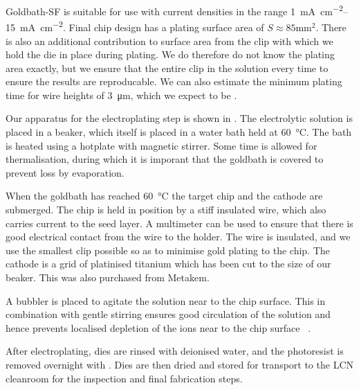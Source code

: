 Goldbath-SF is suitable for use with current densities in the range
\SIrange{1}{15}{\milli\ampere\per\centi\meter\squared}. Final chip design has a
plating surface area of $S\approx85\si{\milli\meter\squared}$. There is also an
additional contribution to surface area from the clip with which we hold the
die in place during plating. We do therefore do not know the plating area
exactly, but we ensure that the entire clip in the solution every time to
ensure the results are reproducable. We can also estimate the minimum plating
time for wire heights of \SI{3}{\micro\meter}, which we expect to be
.


Our apparatus for the electroplating step is shown in
. The electrolytic solution is placed in a
beaker, which itself is placed in a water bath held at \SI{60}{\celsius}. The
bath is heated using a hotplate with magnetic stirrer. Some time is allowed for
thermalisation, during which it is imporant that the goldbath is covered to
prevent loss by evaporation.

When the goldbath has reached \SI{60}{\celsius} the target chip and the cathode
are submerged. The chip is held in position by a stiff insulated wire, which
also carries current to the seed layer. A multimeter can be used to ensure that
there is good electrical contact from the wire to the holder. The wire is
insulated, and we use the smallest clip possible so as to minimise gold plating
to the chip.  The cathode is a grid of platinised titanium which has been cut
to the size of our beaker.  This was also purchased from Metakem.


A bubbler is placed to agitate the solution near to the chip surface. This in
combination with gentle stirring ensures good circulation of the solution and
hence prevents localised depletion of the ions near to the chip
surface~\cite{Schlesinger2011} .

After electroplating, dies are rinsed with deionised water, and the photoresist
is removed overnight with .  Dies are then
dried and stored for transport to the LCN cleanroom for the inspection and
final fabrication steps.

